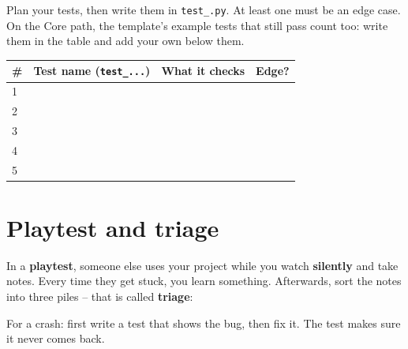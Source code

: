 \begin{exercise}
Plan your tests, then write them in \texttt{test\_<your project>.py}. At least one must be an edge case. On the Core path, the template's example tests that still pass count too: write them in the table and add your own below them.
\begin{center}\small
\begin{tabular}{|p{0.5cm}|p{6.3cm}|p{5cm}|p{1.4cm}|}
\hline
\# & \textbf{Test name} (\texttt{test\_...}) & \textbf{What it checks} & \textbf{Edge?}\\ \hline
1 & & & \\[0.4cm] \hline
2 & & & \\[0.4cm] \hline
3 & & & \\[0.4cm] \hline
4 & & & \\[0.4cm] \hline
5 & & & \\[0.4cm] \hline
\end{tabular}
\end{center}
\end{exercise}

\section{Playtest and triage}
In a \textbf{playtest}, someone else uses your project while you watch \textbf{silently} and take notes. Every time they get stuck, you learn something. Afterwards, sort the notes into three piles -- that is called \textbf{triage}:
\begin{center}
\end{center}
For a crash: first write a test that shows the bug, then fix it. The test makes sure it never comes back.

